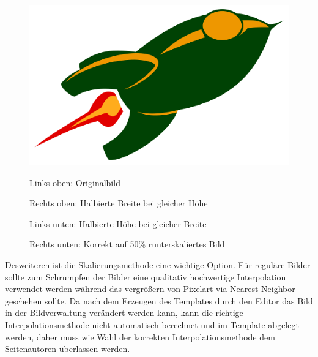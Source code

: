 \begin{figure}
  \includegraphics[width=\columnwidth/100*33]{images/scale-image-good.png}

  Links oben: Originalbild

  Rechts oben: Halbierte Breite bei gleicher Höhe

  Links unten: Halbierte Höhe bei gleicher Breite

  Rechts unten: Korrekt auf 50\% runterskaliertes Bild
\end{figure}

Desweiteren ist die Skalierungsmethode eine wichtige Option. Für reguläre Bilder
sollte zum Schrumpfen der Bilder eine qualitativ hochwertige Interpolation
verwendet werden während das vergrößern von Pixelart via Nearest Neighbor
geschehen sollte. Da nach dem Erzeugen des Templates durch den Editor das Bild
in der Bildverwaltung verändert werden kann, kann die richtige
Interpolationsmethode nicht automatisch berechnet und im Template abgelegt
werden, daher muss wie Wahl der korrekten Interpolationsmethode dem
Seitenautoren überlassen werden.

